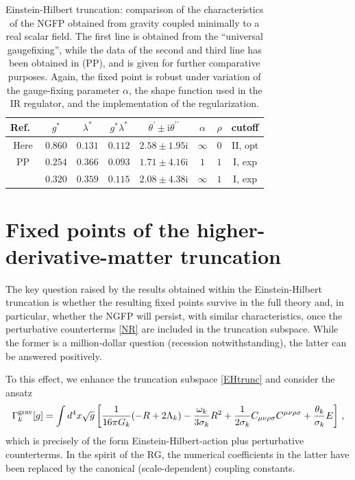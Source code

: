 \documentclass[preprint,preprintnumbers,amsmath,amssymb,nofootinbib,APS]{revtex4}
\newcommand{\be}{\begin{equation}}
\newcommand{\ee}{\end{equation}}
\let\s=\sigma \let\t=\tau   \let\vph=\varphi \let\ph=\phi \let\c=\chi
\newcommand{\2}{\sqrt{2\,}}
\newcommand{\I}{\mathrm{i}}
\begin{document}
\begin{table}[t!]
\begin{center}
\begin{tabular}{|c|cc|c|c||cc|c|}\hline
Ref.\ & \; \; \; $g^*$ \; \; \; & \; \; \; $\lambda^*$ \; \; \; & \; \; \; $g^* \lambda^*$ \; \; \; & \; \; \; $\theta^\prime \pm \I \theta^{\prime \prime}$ \; \; \; & \; \; \; $\alpha$ \; \; \; & \; \; \; $\rho$ \; \; \; & \; \; \; cutoff \; \; \; \\ \hline
%
Here & $0.860$ & $0.131$ & $0.112$ & $2.58 \pm 1.95 \I$ & $\infty$ & $0$ & II, opt 
\\ \hline
%
PP & $0.254$ & $0.366$ & $0.093$ & $1.71 \pm 4.16\I$ & $1$ & $1$ & I, exp \\
& $0.320$ & $0.359$ & $0.115$ & $2.08 \pm 4.38\I$ & $\infty$ & $1$ & I, exp  
\\ \hline
%
\end{tabular}
\parbox[c]{\textwidth}{\caption{\label{t.FPEHs}{Einstein-Hilbert truncation: comparison of the characteristics of the NGFP obtained from gravity coupled minimally to a real scalar field. The first line is obtained from the ``universal gaugefixing'', while the data of the second and third line has been obtained in \cite{Percacci:2002ie,Percacci:2003jz} (PP), and is given for further comparative purposes. Again, the fixed point is robust under variation of the gauge-fixing parameter $\alpha$, the shape function used in the IR regulator, and the implementation of the regularization.}}}
\end{center}
\end{table}

\section{Fixed points of the higher-derivative-matter truncation}
\label{sec:HD}
The key question raised by the results obtained within the Einstein-Hilbert truncation is whether the resulting fixed points survive in the full theory and, in particular, whether the NGFP will persist, with similar characteristics, once the perturbative counterterms 
\eqref{NR} are included in the truncation subspace. While the former is a million-dollar question (recession notwithstanding), the latter can be answered positively. 

To this effect, we enhance the truncation subspace \eqref{EHtrunc} and consider the ansatz 
%
\be\label{HDflow}
\Gamma_k^{\rm grav}[g] = \int d^4x \sqrt{g} \left[ \frac{1}{16 \pi G_k} (-R + 2 \Lambda_k) - \frac{\omega_k}{3 \sigma_k} R^2 + \frac{1}{2 \sigma_k} C_{\mu\nu\rho\sigma} C^{\mu\nu\rho\sigma}   + \frac{\theta_k}{\s_k} E\right] \, ,
\ee
%
which is precisely of the form Einstein-Hilbert-action plus perturbative counterterms. In the spirit of the RG, the numerical coefficients in the latter have been replaced by the canonical (scale-dependent) coupling constants. 
\end{document}
